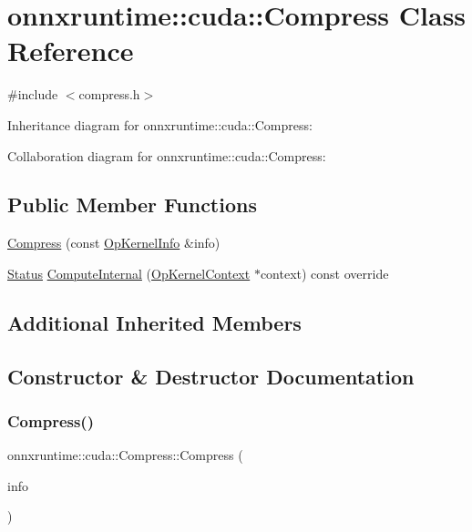 \hypertarget{classonnxruntime_1_1cuda_1_1Compress}{}\section{onnxruntime\+:\+:cuda\+:\+:Compress Class Reference}
\label{classonnxruntime_1_1cuda_1_1Compress}


{\ttfamily \#include $<$compress.\+h$>$}



Inheritance diagram for onnxruntime\+:\+:cuda\+:\+:Compress\+:


Collaboration diagram for onnxruntime\+:\+:cuda\+:\+:Compress\+:
\subsection*{Public Member Functions}
\begin{DoxyCompactItemize}
\item 
\mbox{\hyperlink{classonnxruntime_1_1cuda_1_1Compress_ac34889cd302bf479261666ddab07904d}{Compress}} (const \mbox{\hyperlink{classonnxruntime_1_1OpKernelInfo}{Op\+Kernel\+Info}} \&info)
\item 
\mbox{\hyperlink{classonnxruntime_1_1common_1_1Status}{Status}} \mbox{\hyperlink{classonnxruntime_1_1cuda_1_1Compress_a62be749627510678c38e907dca88cbd1}{Compute\+Internal}} (\mbox{\hyperlink{classonnxruntime_1_1OpKernelContext}{Op\+Kernel\+Context}} $\ast$context) const override
\end{DoxyCompactItemize}
\subsection*{Additional Inherited Members}


\subsection{Constructor \& Destructor Documentation}
\mbox{\label{classonnxruntime_1_1cuda_1_1Compress_ac34889cd302bf479261666ddab07904d}} 
\subsubsection{\texorpdfstring{Compress()}{Compress()}}
{\footnotesize\ttfamily onnxruntime\+::cuda\+::\+Compress\+::\+Compress (\begin{DoxyParamCaption}\item[{const \mbox{\hyperlink{classonnxruntime_1_1OpKernelInfo}{Op\+Kernel\+Info}} \&}]{info }\end{DoxyParamCaption})\hspace{0.3cm}{\ttfamily [inline]}}



